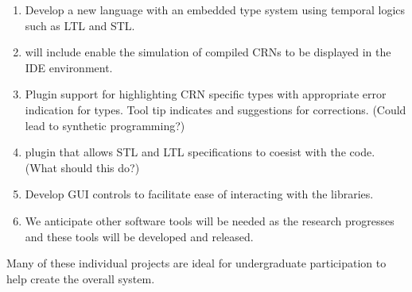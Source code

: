 
\begin{enumerate}
	\item Develop a new language with an embedded type system using temporal logics such as LTL and STL.

	\item will include  enable the simulation of compiled CRNs to be displayed in the IDE environment.
	
	\item Plugin support for highlighting CRN specific types with appropriate error indication for types.  Tool tip indicates and suggestions for corrections.  (Could lead to synthetic programming?)
	
	\item plugin that allows STL and LTL specifications to coesist with the code.  (What should this do?)

	\item Develop GUI controls to facilitate ease of interacting with the libraries.
	
	\item We anticipate other software tools will be needed as the research progresses and these tools will be developed and released.
\end{enumerate}

Many of these individual projects are ideal for undergraduate participation to help create the overall system.


